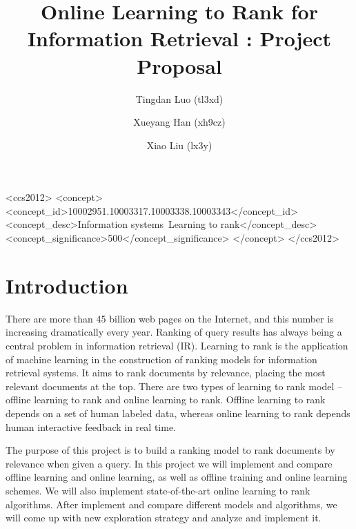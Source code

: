 \documentclass[acmlarge]{acmart}
\begin{document}
\title{Online Learning to Rank for Information Retrieval : Project Proposal}
\author{Tingdan Luo (tl3xd)}
\author{Xueyang Han (xh9cz)}
\author{Xiao Liu (lx3y)}

\begin{abstract}
\end{abstract}

\begin{CCSXML}
<ccs2012>
<concept>
<concept_id>10002951.10003317.10003338.10003343</concept_id>
<concept_desc>Information systems~Learning to rank</concept_desc>
<concept_significance>500</concept_significance>
</concept>
</ccs2012>
\end{CCSXML}


\maketitle

\section{Introduction}
There are more than 45 billion web pages on the Internet, and this number is increasing dramatically every year. Ranking of query results has always being a central problem in information retrieval (IR). Learning to rank is the application of machine learning in the construction of ranking models for information retrieval systems. It aims to rank documents by relevance, placing the most relevant documents at the top. There are two types of learning to rank model -- offline learning to rank and online learning to rank. Offline learning to rank depends on a set of human labeled data, whereas online learning to rank depends human interactive feedback in real time.

The purpose of this project is to build a ranking model to rank documents by relevance when given a query. In this project we will implement and compare offline learning and online learning, as well as offline training and online learning schemes. We will also implement state-of-the-art online learning to rank algorithms. After implement and compare different models and algorithms, we will come up with new exploration strategy and analyze and implement it.
\end{document}
